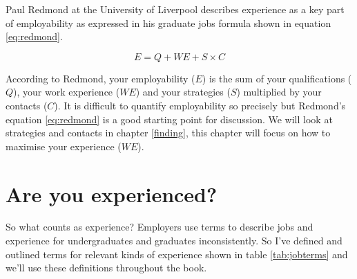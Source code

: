 \documentclass[
]{book}
\begin{document}
Paul Redmond at the University of Liverpool describes experience as a key part of employability \citep{paulredmond} as expressed in his graduate jobs formula shown in equation \eqref{eq:redmond}.

\begin{equation}
  E = Q + WE + S \times C
  \label{eq:redmond}
\end{equation}

According to Redmond, your employability (\(E\)) is the sum of your qualifications (\(Q\)), your work experience (\(WE\)) and your strategies (\(S\)) multiplied by your contacts (\(C\)). It is difficult to quantify employability so precisely but Redmond's equation \eqref{eq:redmond} is a good starting point for discussion. We will look at strategies and contacts in chapter \ref{finding}, this chapter will focus on how to maximise your experience (\(WE\)).

\hypertarget{areuexperienced}{%
\section{Are you experienced?}\label{areuexperienced}}

So what counts as experience? Employers use terms to describe jobs and experience for undergraduates and graduates inconsistently. So I've defined and outlined terms for relevant kinds of experience shown in table \ref{tab:jobterms} and we'll use these definitions throughout the book.
\end{document}
